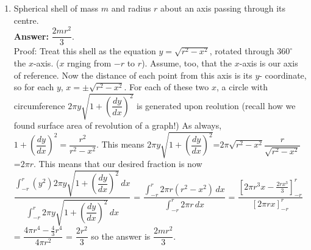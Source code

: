 \documentclass[11pt,a4paper]{article}
\begin{document}
\begin{enumerate}
\item Spherical shell of mass $m$ and radius $r$ about an axis passing through its centre.\\ 
\textbf {Answer: } $\dfrac{2mr^2}{3}$.\\
Proof: Treat this shell as the equation $y=\sqrt{r^2-x^2}$, rotated through $360^{\circ}$ the $x$-axis. ($x$ rnging from $-r$ to $r$). Assume, too, that the $x$-axis is our axis of reference. Now the distance of each point from this axis is its $y$- coordinate, so for each $y$, $x=\pm\sqrt{r^2-x^2}$. For each of these two $x$, a circle with circumference $2\pi y\sqrt{1+\left(\dfrac{dy}{dx}\right)^2}$ is generated upon reolution (recall how we found surface area of revolution of a graph!) As always, $1+\left(\dfrac{dy}{dx}\right)^2=\dfrac{r^2}{r^2-x^2}.$ This means $2\pi y\sqrt{1+\left(\dfrac{dy}{dx}\right)^2}$=$2\pi \sqrt{r^2-x^2}\dfrac{r}{\sqrt{r^2-x^2}}$=$2\pi r.$ This means that our desired fraction is now $\dfrac{\int_{-r}^{r}(y^2)2\pi y\sqrt{1+\left(\dfrac{dy}{dx}\right)^2}\,dx}{\int_{-r}^{r}2\pi y\sqrt{1+\left(\dfrac{dy}{dx}\right)^2}\,dx}$ = $\dfrac{\int_{-r}^{r}2\pi r(r^2-x^2)\,dx}{\int_{-r}^{r}2\pi r\,dx}$ = $\dfrac{[2\pi r^3x-\frac{2rx^3}{3}]_{-r}^r}{[2\pi rx]_{-r}^r}$ = $\dfrac{4\pi r^4-\frac{4}{3}r^4}{4\pi r^2}$ = $\dfrac{2r^2}{3}$ so the answer is $\dfrac{2mr^2}{3}$.


\end{enumerate}
\end{document}
